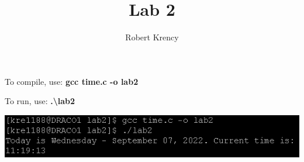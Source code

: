\documentclass{article}
\date{}
\author{Robert Krency}
\title{Lab 2}
\begin{document}
\maketitle
\thispagestyle{fancy}

To compile, use: \textbf{gcc time.c -o lab2}

To run, use: \textbf{.\textbackslash lab2}

\begin{center}
    \includegraphics{screenshot.png}    
\end{center}
\end{document}

